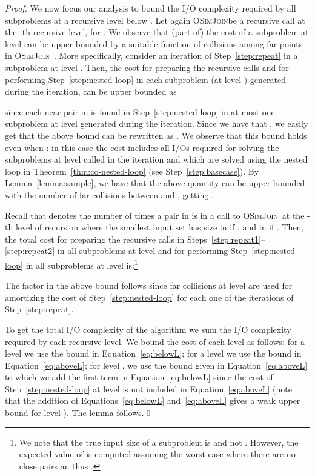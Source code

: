 \documentclass{llncs}
\newcommand{\SimJoin}{\textsc{OSimJoin}}
\begin{document}
\begin{proof}
We now focus our analysis to  bound the I/O complexity required by all subproblems at a recursive level below .
Let again \SimJoin be a recursive call at the -th recursive level, for .
We observe that (part of) the cost of a subproblem at level  can be upper bounded by a suitable function of collisions among far points in
\SimJoin\ .
More specifically, consider an iteration of Step~\ref{step:repeat} in a subproblem at level . 
Then, the cost for preparing the recursive calls and for performing Step~\ref{step:nested-loop} in each  subproblem (at level ) generated during the iteration, can be upper bounded as

since each near pair in  is found in Step~\ref{step:nested-loop} in at most one subproblem at level  generated during the iteration. 
Since we have that , we easily get that the above bound can be rewritten as . 
We observe that this bound holds even when : in this case the cost includes all I/Os required for solving the subproblems at level  called in the iteration and which are solved using the nested loop in Theorem~\ref{thm:co-nested-loop} (see Step~\ref{step:basecase}). 
By Lemma~\ref{lemma:sample}, we have that the above quantity can be upper bounded with the number of far collisions between  and , getting . 

Recall that  denotes the number of times a pair in  is in a call to \SimJoin\ at the -th level of recursion where the smallest input set has size in  if , and in  if . 
Then, the total cost for preparing the recursive calls in Steps~\ref{step:repeat1}--\ref{step:repeat2} in all subproblems at level  and for performing Step~\ref{step:nested-loop} in all subproblems at level  is:\footnote{We note that the true input size of a subproblem is 
and not . However, the expected value of  is computed assuming the worst case where there are no close pairs an thus .}

The  factor in the above bound follows since far collisions at level  are used for amortizing the cost of Step~\ref{step:nested-loop} for each one of the  iterations of Step~\ref{step:repeat}.

To get the total I/O complexity of the algorithm we sum the I/O complexity required by each recursive level. 
We bound the cost of each level as follows:
for a level  we use the bound in Equation~\ref{eq:belowL}; 
for a level  we use the bound in Equation~\ref{eq:aboveL}; 
for level , we use the bound given in Equation~\ref{eq:aboveL} to which we add the first term in Equation~\ref{eq:belowL} since  the cost of
Step~\ref{step:nested-loop} at level  is not included in Equation~\ref{eq:aboveL} (note that the addition of Equations~\ref{eq:belowL}
and~\ref{eq:aboveL} gives a weak upper bound for level ).
The lemma follows.\qed
\end{proof}
\end{document}

